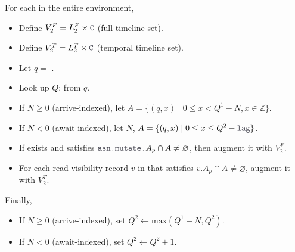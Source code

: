 \filbreak
{} For each  in the entire environment,
\begin{itemize}
  \item Define $V_2^F = L_2^F \times \lighttt{C}$ (full timeline set).
  \filbreak
  \item Define $V_2^T = L_2^T \times \lighttt{C}$ (temporal timeline set).
  \filbreak
  \item Let $q =$ .
  \filbreak
  \item Look up $Q$:  from $q$.
  \filbreak
  \item If $N \ge 0$ (arrive-indexed), let $A = \{ (q, x) \mid 0 \le x < Q^1 - N, x \in \mathbb{Z} \}$.
  \filbreak
  \item If $N < 0$ (await-indexed), let $N$, $A = \{ (q, x) \mid 0 \le x \le Q^2 - \lighttt{lag} \}$.
  \filbreak
  \item If  exists and satisfies $\lighttt{asn.mutate.}A_p \cap A \ne \varnothing$, then augment it with $V_2^F$.
  \filbreak
  \item For each read visibility record $v$ in  that satisfies $v.A_p \cap A \ne \varnothing$, augment it with $V_2^T$.
\end{itemize}
Finally,
\begin{itemize}
  \item If $N \ge 0$ (arrive-indexed), set $Q^2 \leftarrow \text{max}(Q^1 - N, Q^2)$.
  \item If $N < 0$ (await-indexed), set $Q^2 \leftarrow Q^2 + 1$.
\end{itemize}


